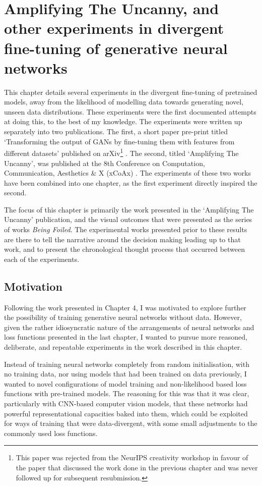 \chapter{Amplifying The Uncanny, and other experiments in divergent fine-tuning of generative neural networks}
\label{ch:uncanny}

This chapter details several experiments in the divergent fine-tuning of pretrained models, away from the likelihood of modelling data towards generating novel, unseen data distributions. 
These experiments were the first documented attempts at doing this, to the best of my knowledge. 
The experiments were written up separately into two publications. 
The first, a short paper pre-print titled `Transforming the output of GANs by fine-tuning them with features from different datasets’ published on arXiv\footnote{
    This paper was rejected from the NeurIPS creativity workshop in favour of the paper that discussed the work done in the previous chapter \citep{broad2019searching} and was never followed up for subsequent resubmission.} \citep{broad2019transforming}. 
The second, titled `Amplifying The Uncanny’, was published at the 8th Conference on Computation, Communication, Aesthetics \& X (xCoAx) \citep{broad2020amplifying}. 
The experiments of these two works have been combined into one chapter, as the first experiment directly inspired the second.

The focus of this chapter is primarily the work presented in the `Amplifying The Uncanny’ publication, and the visual outcomes that were presented as the series of works \textit{Being Foiled}. 
The experimental works presented prior to these results are there to tell the narrative around the decision making leading up to that work, and to present the chronological thought process that occurred between each of the experiments. 

\section{Motivation}

Following the work presented in Chapter 4, I was motivated to explore further the possibility of training generative neural networks without data. 
However, given the rather idiosyncratic nature of the arrangements of neural networks and loss functions presented in the last chapter, I wanted to pursue more reasoned, deliberate, and repeatable experiments in the work described in this chapter. 

Instead of training neural networks completely from random initialisation, with no training data, nor using models that had been trained on data previously, I wanted to novel configurations of model training and non-likelihood based loss functions with pre-trained models. 
The reasoning for this was that it was clear, particularly with CNN-based computer vision models, that these networks had powerful representational capacities baked into them, which could be exploited for ways of training that were data-divergent, with some small adjustments to the commonly used loss functions. 

